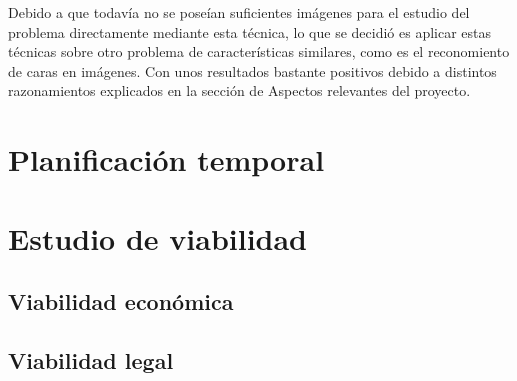 Debido a que todavía no se poseían suficientes imágenes para el estudio del problema directamente mediante esta técnica, lo que se decidió es aplicar estas técnicas sobre otro problema de características similares, como es el reconomiento de caras en imágenes. Con unos resultados bastante positivos debido a distintos razonamientos explicados en la sección de Aspectos relevantes del proyecto.

\begin{comment}
\begin{figure}[h]
\centering
\texttt{[image: semana\_1]}
\caption{Burndown de la semana 1}
\label{fig:A.1.1}
\end{figure}
\end{comment}

\section{Planificación temporal}

\section{Estudio de viabilidad}

\subsection{Viabilidad económica}

\subsection{Viabilidad legal}


